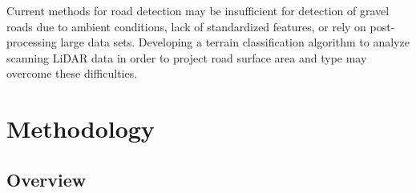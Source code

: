 \documentclass[journal,onecolumn]{IEEEtran}
\begin{document}
	{Current methods for road detection may be insufficient for detection of gravel roads due to ambient conditions, lack of standardized features, or rely on post-processing large data sets. Developing a terrain classification algorithm to analyze scanning LiDAR data in order to project road surface area and type may overcome these difficulties.}

	
	

	
	
	\section{Methodology}

		\subsection{Overview}
\end{document}
